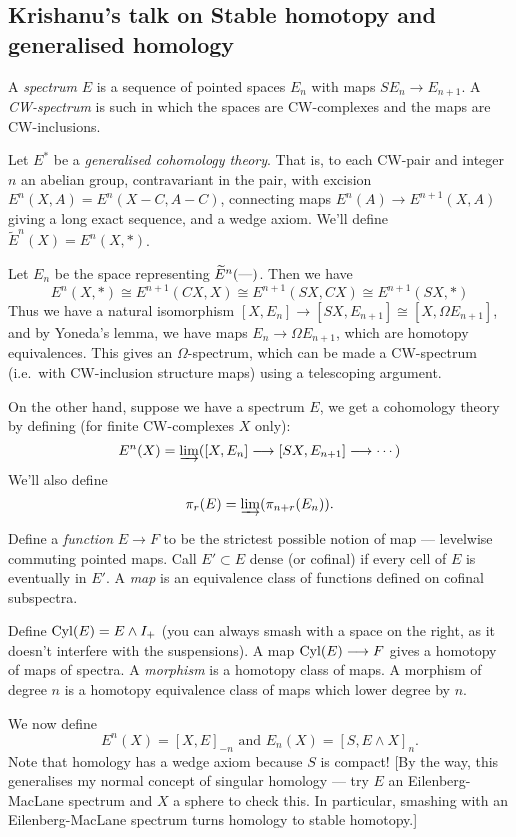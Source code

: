 \documentclass[11pt]{article}
\newcommand{\KanSemResponse}[1]
{
\thispagestyle{fancy}
\subsection*{#1}
}
\begin{document}
\begin{KrishanuAdamsStableHtpy}
\KanSemResponse
{Krishanu's talk on Stable homotopy and generalised homology}
A \emph{spectrum} $E$ is a sequence of pointed spaces $E_n$ with maps $SE_n\to E_{n+1}$. A \emph{CW-spectrum} is such in which the spaces are CW-complexes and the maps are CW-inclusions.

Let $E^*$ be a \emph{generalised cohomology theory}. That is, to each CW-pair and integer $n$ an abelian group, contravariant in the pair, with excision $E^n(X,A)=E^n(X-C,A-C)$, connecting maps $E^n(A)\to E^{n+1}(X,A)$ giving a long exact sequence, and a wedge axiom.
We'll define $\widetilde E^n(X)=E^n(X,\ast)$.

Let $E_n$ be the space representing $\widetilde E^n(\DASH)$. Then we have
\[E^n(X,\ast)\cong E^{n+1}(CX,X)\cong E^{n+1}(SX,CX)\cong E^{n+1}(SX,\ast)\]
Thus we have a natural isomorphism $[X,E_n]\to[SX,E_{n+1}]\cong [X,\Omega E_{n+1}]$, and by Yoneda's lemma, we have maps $E_n\to\Omega E_{n+1}$, which are homotopy equivalences. This gives an $\Omega$-spectrum, which can be made a CW-spectrum (i.e.\ with CW-inclusion structure maps) using a telescoping argument.

On the other hand, suppose we have a spectrum $E$, we get a cohomology theory by defining (for finite CW-complexes $X$ only):
\[E^n(X)=\varinjlim([X,E_n]\to[SX,E_{n+1}]\to\cdots)\]
We'll also define
\[\pi_r(E)=\varinjlim(\pi_{n+r}(E_n)).\]

Define a \emph{function} $E\to F$ to be the strictest possible notion of map --- levelwise commuting pointed maps. Call $E'\subset E$ dense (or cofinal) if every cell of $E$ is eventually in $E'$. A \emph{map} is an equivalence class of functions defined on cofinal subspectra.

Define $\Cyl(E)=E\wedge I_+$ (you can always smash with a space on the right, as it doesn't interfere with the suspensions). A map $\Cyl(E)\to F$ gives a homotopy of maps of spectra. A \emph{morphism} is a homotopy class of maps. A morphism of degree $n$ is a homotopy equivalence class of maps which lower degree by $n$.

We now define
\[E^n(X)=[X,E]_{-n}\text{ \ and \ }E_n(X)=[S,E\wedge X]_n.\]
Note that homology has a wedge axiom because $S$ is compact!
[By the way, this generalises my normal concept of singular homology --- try $E$ an Eilenberg-MacLane spectrum and $X$ a sphere to check this. In particular, smashing with an Eilenberg-MacLane spectrum turns homology to stable homotopy.]


\end{KrishanuAdamsStableHtpy}
\end{document}
